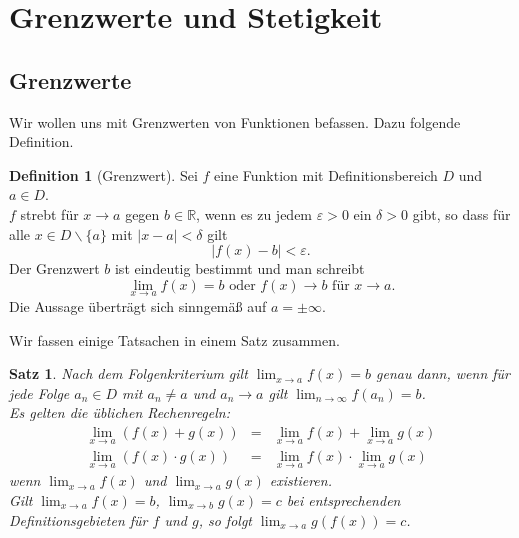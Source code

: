 \documentclass[fontsize=12pt,paper=a4,twoside,bibtotoc,idxtotoc,
liststotoc,pagesize,BCOR1.2cm,DIV15,chapterprefix,pagesize=pdftex]{scrbook}
\theoremstyle{plain}
\newtheorem{sz}[equation]{Satz}
\theoremstyle{definition}
\newtheorem{df}[equation]{Definition}
\theoremstyle{remark}
\begin{document}
\section{Grenzwerte und Stetigkeit}
\subsection{Grenzwerte}
Wir wollen uns mit Grenzwerten von Funktionen befassen. Dazu folgende Definition.
\begin{df}[Grenzwert]
Sei $f$ eine Funktion mit Definitionsbereich $D$ und $a\in D$.\\
$f$ strebt für $x \rightarrow a$ gegen $b \in \mathbb{R}$, wenn es zu jedem $\varepsilon >0$ ein $\delta >0$ gibt, so
dass für alle $x \in D\smallsetminus\{a \}$ mit $|x-a|<\delta$ gilt 
\[ |f(x)-b| < \varepsilon .\]
Der Grenzwert $b$ ist eindeutig bestimmt und man schreibt
\[ \lim_{x \rightarrow a} f(x) =b \mbox{ oder } f(x) \rightarrow b
\mbox{ für } x \rightarrow a. \]
Die Aussage überträgt sich sinngemäß auf $a=\pm \infty$.
\end{df}
Wir fassen einige Tatsachen in einem Satz zusammen.
\begin{sz}
Nach dem Folgenkriterium gilt $ \lim_{x \rightarrow a} f(x) =b$
genau dann, wenn für jede Folge $a_n \in D$ mit $a_n \neq a$ und $a_n \rightarrow a$
gilt $\lim_{n \rightarrow \infty} f(a_n)=b$.\\
Es gelten die üblichen Rechenregeln:
\begin{eqnarray*}
\lim_{x \rightarrow a}(f(x)+g(x)) &=&\lim_{x \rightarrow a} f(x) +
\lim_{x \rightarrow a} g(x) \\
\lim_{x \rightarrow a}(f(x) \cdot g(x)) &=& \lim_{x \rightarrow a}
f(x) \cdot \lim_{x \rightarrow a} g(x)
\end{eqnarray*}
wenn $\lim_{x \rightarrow a} f(x)$ und $\lim_{x \rightarrow a}g(x)$
existieren.\\
Gilt $\lim_{x \rightarrow a} f(x)=b$, $\lim_{x \rightarrow b}
g(x)=c$ bei entsprechenden Definitionsgebieten für $f$ und $g$, so
folgt $\lim_{x \rightarrow a} g(f(x)) =c$.
\end{sz}
\end{document}
